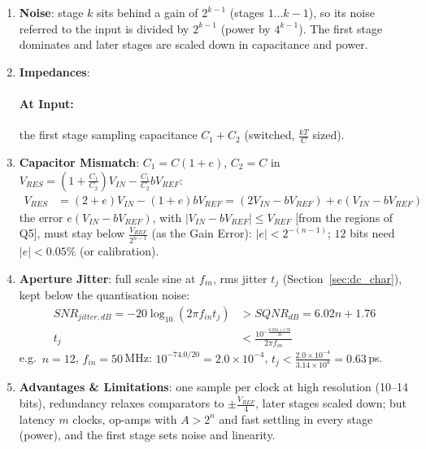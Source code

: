 \begin{enumerate}
    just below it still gets \(b = 0\), \(V_{RES} = 2\left(\frac{V_{REF}}{4} + d\right) = \frac{V_{REF}}{2} + 2d\), which stays
    \(\leq V_{REF}\) for \(d \leq \frac{V_{REF}}{4}\) (and symmetrically for \(d < 0\) and the
    lower threshold). The residue stays in range and later stages absorb the
    decision error, so cheap comparators with offsets up to
    \(\pm\frac{V_{REF}}{4}\) suffice.
  \item \textbf{Noise}: stage \(k\) sits behind a gain of \(2^{k-1}\) (stages
    \(1 \ldots k-1\)), so its noise referred to the input is divided by
    \(2^{k-1}\) (power by \(4^{k-1}\)). The first stage dominates and later stages
    are scaled down in capacitance and power.
  \item \textbf{Impedances}:
    \paragraph{At Input:} the first stage sampling capacitance \(C_1 + C_2\) (switched, \(\frac{kT}{C}\) sized).
  \item \textbf{Capacitor Mismatch}: \(C_1 = C(1 + e)\), \(C_2 = C\) in \(V_{RES} = \left(1 + \frac{C_1}{C_2}\right)V_{IN} - \frac{C_1}{C_2}bV_{REF}\):
    \begin{align*}
      V_{RES} &= (2 + e)V_{IN} - (1 + e)bV_{REF} = (2V_{IN} - bV_{REF}) + e(V_{IN} - bV_{REF})
    \end{align*}
    the error \(e(V_{IN} - bV_{REF})\), with \(|V_{IN} - bV_{REF}| \leq V_{REF}\) [from the regions of Q5], must stay below
    \(\frac{V_{REF}}{2^{n-1}}\) (as the Gain Error): \(|e| < 2^{-(n-1)}\); \(12\) bits need \(|e| < 0.05\%\) (or calibration).
  \item \textbf{Aperture Jitter}: full scale sine at \(f_{in}\), rms jitter \(t_j\) (Section~\ref{sec:dc_char}), kept
    below the quantisation noise:
    \begin{align*}
      SNR_{jitter,dB} = -20\log_{10}(2\pi f_{in} t_j) &> SQNR_{dB} = 6.02n + 1.76 \\
      t_j &< \frac{10^{-\frac{6.02n + 1.76}{20}}}{2\pi f_{in}}
    \end{align*}
    e.g.\ \(n = 12\), \(f_{in} = 50\,\)MHz: \(10^{-74.0/20} = 2.0 \times 10^{-4}\), \(t_j < \frac{2.0 \times 10^{-4}}{3.14 \times 10^{8}} = 0.63\,\)ps.
  \item \textbf{Advantages \& Limitations}: one sample per clock at high resolution (10--14 bits),
    redundancy relaxes comparators to \(\pm\frac{V_{REF}}{4}\), later stages scaled down; but latency \(m\)
    clocks, op-amps with \(A > 2^n\) and fast settling in every stage (power), and the first
    stage sets noise and linearity.
\end{enumerate}

